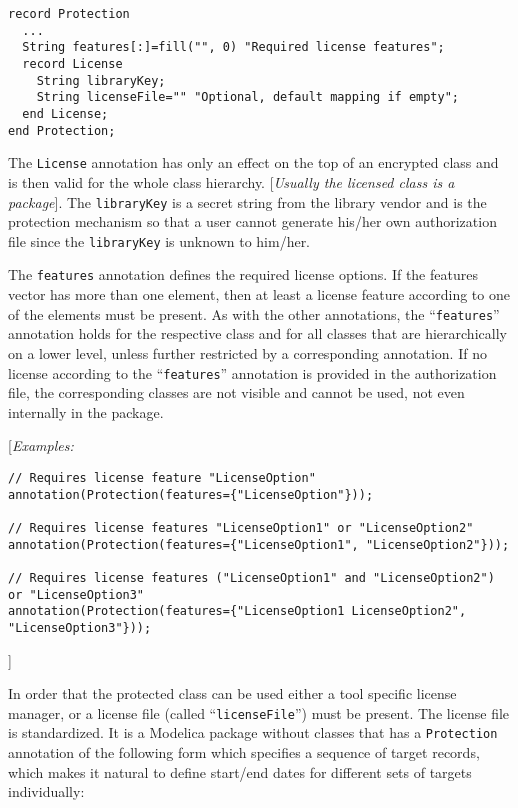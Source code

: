 \begin{lstlisting}[language=modelica]
record Protection
  ...
  String features[:]=fill("", 0) "Required license features";
  record License
    String libraryKey;
    String licenseFile="" "Optional, default mapping if empty";
  end License;
end Protection;
\end{lstlisting}
The \lstinline!License! annotation has only an effect on the top of an encrypted
class and is then valid for the whole class hierarchy. {[}\emph{Usually
the licensed class is a package}{]}. The \lstinline!libraryKey! is a secret string
from the library vendor and is the protection mechanism so that a user
cannot generate his/her own authorization file since the \lstinline!libraryKey! is
unknown to him/her.

The \lstinline!features! annotation defines the required license options. If the
features vector has more than one element, then at least a license
feature according to one of the elements must be present. As with the
other annotations, the ``\lstinline!features!'' annotation holds for the respective
class and for all classes that are hierarchically on a lower level,
unless further restricted by a corresponding annotation. If no license
according to the ``\lstinline!features!'' annotation is provided in the
authorization file, the corresponding classes are not visible and cannot
be used, not even internally in the package.

{[}\emph{Examples:}
\begin{lstlisting}[language=modelica]
// Requires license feature "LicenseOption"
annotation(Protection(features={"LicenseOption"}));

// Requires license features "LicenseOption1" or "LicenseOption2"
annotation(Protection(features={"LicenseOption1", "LicenseOption2"}));

// Requires license features ("LicenseOption1" and "LicenseOption2") or "LicenseOption3"
annotation(Protection(features={"LicenseOption1 LicenseOption2", "LicenseOption3"}));
\end{lstlisting}

{]}

In order that the protected class can be used either a tool specific
license manager, or a license file (called ``\lstinline!licenseFile!'') must be
present. The license file is standardized. It is a Modelica package
without classes that has a \lstinline!Protection! annotation of the following form
which specifies a sequence of target records, which makes it natural to
define start/end dates for different sets of targets individually:

